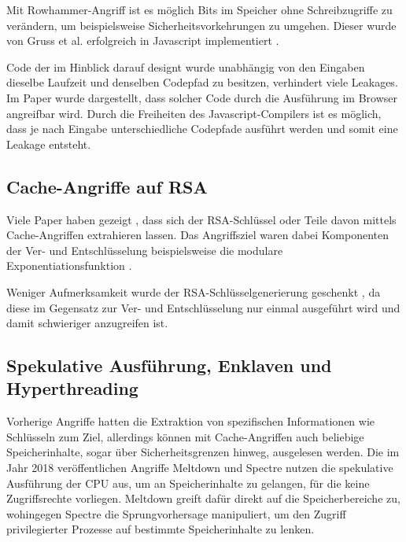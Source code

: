 Mit Rowhammer-Angriff \cite{Rowhammer} ist es möglich Bits im Speicher ohne Schreibzugriffe zu verändern, um beispielsweise Sicherheitsvorkehrungen zu umgehen. 
Dieser wurde von Gruss et al. erfolgreich in Javascript implementiert \cite{RowhammerJS}.

Code der im Hinblick darauf designt wurde unabhängig von den Eingaben dieselbe Laufzeit und denselben Codepfad zu besitzen, verhindert viele Leakages.
Im Paper \cite{DriveByPaper} wurde dargestellt, dass solcher Code durch die Ausführung im Browser angreifbar wird.
Durch die Freiheiten des Javascript-Compilers ist es möglich, dass je nach Eingabe unterschiedliche Codepfade ausführt werden und somit eine Leakage entsteht.

\subsection{Cache-Angriffe auf RSA}

Viele Paper haben gezeigt \cite{CacheBleedOpenSSLRSA, FlushReload, DriveByPaper}, dass sich der RSA-Schlüssel oder Teile davon mittels Cache-Angriffen extrahieren lassen. Das Angriffsziel waren dabei Komponenten der Ver- und Entschlüsselung beispielsweise die modulare Exponentiationsfunktion \cite{CacheBleedOpenSSLRSA, DriveByPaper, DriveByPaper}. 

Weniger Aufmerksamkeit wurde der RSA-Schlüsselgenerierung geschenkt \cite{RSAKeyGeneration2}, da diese im Gegensatz zur Ver- und Entschlüsselung nur einmal ausgeführt wird und damit schwieriger anzugreifen ist. 


\subsection{Spekulative Ausführung, Enklaven und Hyperthreading}
\label{related_work}

Vorherige Angriffe hatten die Extraktion von spezifischen Informationen wie Schlüsseln zum Ziel, allerdings können mit Cache-Angriffen auch beliebige Speicherinhalte, sogar über Sicherheitsgrenzen hinweg, ausgelesen werden.
Die im Jahr 2018 veröffentlichen Angriffe Meltdown \cite{MeltdownPaper} und Spectre \cite{SpectrePaper} nutzen die spekulative Ausführung der CPU aus, um an Speicherinhalte zu gelangen, für die keine Zugriffsrechte vorliegen.
Meltdown greift dafür direkt auf die Speicherbereiche zu, wohingegen Spectre die Sprungvorhersage manipuliert, um den Zugriff privilegierter Prozesse auf bestimmte Speicherinhalte zu lenken.

